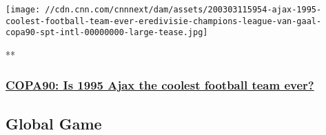 \href{/videos/sports/2020/03/03/ajax-1995-coolest-football-team-ever-eredivisie-champions-league-van-gaal-copa90-spt-intl.copa90}{}

\texttt{[image: //cdn.cnn.com/cnnnext/dam/assets/200303115954-ajax-1995-coolest-football-team-ever-eredivisie-champions-league-van-gaal-copa90-spt-intl-00000000-large-tease.jpg]}

**

\hypertarget{copa90-is-1995-ajax-the-coolest-football-team-ever}{%
\subsubsection{\texorpdfstring{\href{/videos/sports/2020/03/03/ajax-1995-coolest-football-team-ever-eredivisie-champions-league-van-gaal-copa90-spt-intl.copa90}{COPA90:
Is 1995 Ajax the coolest football team
ever?}}{COPA90: Is 1995 Ajax the coolest football team ever?}}\label{copa90-is-1995-ajax-the-coolest-football-team-ever}}

\hypertarget{global-game-}{%
\subsection{Global Game~}\label{global-game-}}

